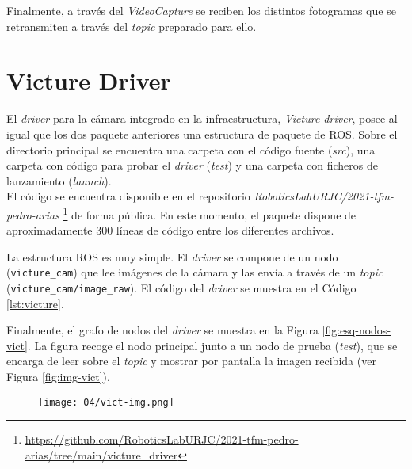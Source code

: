 \documentclass[../main.tex]{subfiles}
\begin{document}
Finalmente, a través del \emph{VideoCapture} se reciben los distintos fotogramas que se retransmiten a través del \emph{topic} preparado para ello.

\section{Victure Driver} \label{section:infra-victure}
El \emph{driver} para la cámara integrado en la infraestructura, \emph{Victure driver}, posee al igual que los dos paquete anteriores una estructura de paquete de ROS. Sobre el directorio principal se encuentra una carpeta con el código fuente (\emph{src}), una carpeta con código para probar el \emph{driver} (\emph{test}) y una carpeta con ficheros de lanzamiento (\emph{launch}). \\
El código se encuentra disponible en el repositorio \emph{RoboticsLabURJC/2021-tfm-pedro-arias} \footnote{\url{https://github.com/RoboticsLabURJC/2021-tfm-pedro-arias/tree/main/victure_driver}} de forma pública. En este momento, el paquete dispone de aproximadamente 300 líneas de código entre los diferentes archivos.

La estructura ROS es muy simple. El \emph{driver} se compone de un nodo (\lstinline{victure_cam}) que lee imágenes de la cámara y las envía a través de un \emph{topic} (\lstinline{victure_cam/image_raw}). El código del \emph{driver} se muestra en el Código \ref{lst:victure}. 

\begin{figure}[!ht]
 	{}
\end{figure}

\newpage


Finalmente, el grafo de nodos del \emph{driver} se muestra en la Figura \ref{fig:esq-nodos-vict}. La figura recoge el nodo principal junto a un nodo de prueba (\emph{test}), que se encarga de leer sobre el \emph{topic} y mostrar por pantalla la imagen recibida (ver Figura \ref{fig:img-vict}).

\begin{figure}[!ht]
 	{\texttt{[image: 04/vict-img.png]}}
\end{figure}
\end{document}
